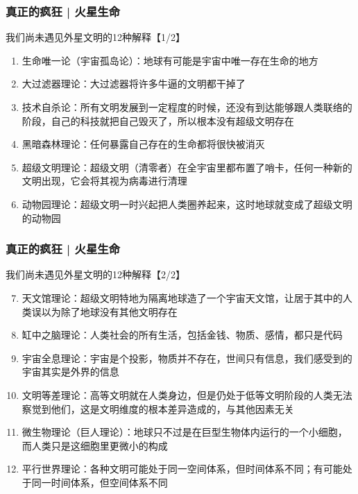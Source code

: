 \begin{frame}
  \frametitle{真正的疯狂 | 火星生命}
  \begin{block}{我们尚未遇见外星文明的12种解释【1/2】}
  \begin{enumerate}
    \item 生命唯一论（宇宙孤岛论）：地球有可能是宇宙中唯一存在生命的地方
    \item 大过滤器理论：大过滤器将许多牛逼的文明都干掉了
    \item 技术自杀论：所有文明发展到一定程度的时候，还没有到达能够跟人类联络的阶段，自己的科技就把自己毁灭了，所以根本没有超级文明存在
    \item 黑暗森林理论：任何暴露自己存在的生命都将很快被消灭
    \item 超级文明理论：超级文明（清零者）在全宇宙里都布置了哨卡，任何一种新的文明出现，它会将其视为病毒进行清理
    \item 动物园理论：超级文明一时兴起把人类圈养起来，这时地球就变成了超级文明的动物园
  \end{enumerate}
  \end{block}
\end{frame}

\begin{frame}
  \frametitle{真正的疯狂 | 火星生命}
  \begin{block}{我们尚未遇见外星文明的12种解释【2/2】}
  \begin{enumerate}
    \setcounter{enumi}{6}
    \item 天文馆理论：超级文明特地为隔离地球造了一个宇宙天文馆，让居于其中的人类误以为除了地球没有其他文明存在
    \item 缸中之脑理论：人类社会的所有生活，包括金钱、物质、感情，都只是代码
    \item 宇宙全息理论：宇宙是个投影，物质并不存在，世间只有信息，我们感受到的宇宙其实是外界的信息
    \item 文明等差理论：高等文明就在人类身边，但是仍处于低等文明阶段的人类无法察觉到他们，这是文明维度的根本差异造成的，与其他因素无关
    \item 微生物理论（巨人理论）：地球只不过是在巨型生物体内运行的一个小细胞，而人类只是这细胞里更微小的构成
    \item 平行世界理论：各种文明可能处于同一空间体系，但时间体系不同；有可能处于同一时间体系，但空间体系不同
  \end{enumerate}
  \end{block}
\end{frame}

